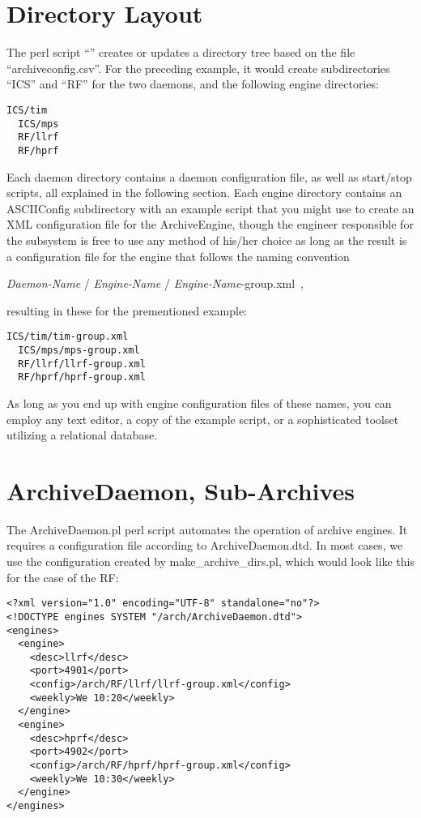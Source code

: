 \section{Directory Layout}
The perl script ``'' creates or updates a
directory tree based on the file ``archiveconfig.csv''. For the preceding
example, it would create subdirectories ``ICS'' and ``RF'' for the two
daemons, and the following engine directories:
\begin{lstlisting}[frame=none,keywordstyle=\sffamily]
  ICS/tim
  ICS/mps
  RF/llrf
  RF/hprf
\end{lstlisting}
\noindent Each daemon directory contains a daemon configuration file,
as well as start/stop scripts, all explained in the following section.
Each engine directory contains an ASCIIConfig subdirectory with an
example script that you might use to create an XML configuration file for the
ArchiveEngine, though the engineer responsible for the subsystem is
free to use any method of his/her choice as long as the result is a
configuration file for the engine that follows the naming convention
\begin{center}
{\it Daemon-Name} / {\it Engine-Name} / {\it Engine-Name}-group.xml~,\\
\end{center}
resulting in these for the prementioned example:
\begin{lstlisting}[frame=none,keywordstyle=\sffamily]
  ICS/tim/tim-group.xml
  ICS/mps/mps-group.xml
  RF/llrf/llrf-group.xml
  RF/hprf/hprf-group.xml
\end{lstlisting}
As long as you end up with engine configuration files of these names,
you can employ any text editor, a copy of the example script, or a
sophisticated toolset utilizing a relational database.

\section{ArchiveDaemon, Sub-Archives}
The ArchiveDaemon.pl perl script automates the operation of archive
engines. It requires a configuration file according to
ArchiveDaemon.dtd. In most cases, we use the configuration created by
make\_archive\_dirs.pl, which would look like this for the case of the
RF:
\begin{lstlisting}[frame=none,keywordstyle=\sffamily]
<?xml version="1.0" encoding="UTF-8" standalone="no"?>
<!DOCTYPE engines SYSTEM "/arch/ArchiveDaemon.dtd">
<engines>
  <engine>
    <desc>llrf</desc>
    <port>4901</port>
    <config>/arch/RF/llrf/llrf-group.xml</config>
    <weekly>We 10:20</weekly>
  </engine>
  <engine>
    <desc>hprf</desc>
    <port>4902</port>
    <config>/arch/RF/hprf/hprf-group.xml</config>
    <weekly>We 10:30</weekly>
  </engine>
</engines>
\end{lstlisting}

